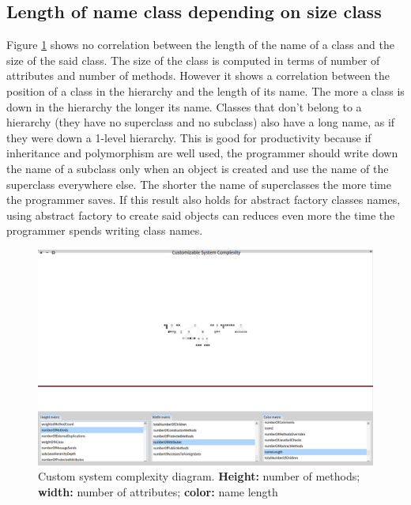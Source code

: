 \subsection{Length of name class depending on size class}
Figure \ref{fig:namelength} shows no correlation between the length of the name of a class and the size of the said class. The size of the class is computed in terms of number of attributes and number of methods.
However it shows a correlation between the position of a class in the hierarchy and the length of its name. The more a class is down in the hierarchy the longer its name. Classes that don't belong to a hierarchy (they have no superclass and no subclass) also have a long name, as if they were down a 1-level hierarchy. This is good for productivity because if inheritance and polymorphism are well used, the programmer should write down the name of a subclass only when an object is created and use the name of the superclass everywhere else. The shorter the name of superclasses the more time the programmer saves. If this result also holds for abstract factory classes names, using abstract factory to create said objects can reduces even more the time the programmer spends writing class names.

\begin{figure}[H]
    \includegraphics[width=\textwidth]{namelength.png}
    \caption{\label{fig:namelength} Custom system complexity diagram. \textbf{Height:} number of methods; \textbf{width:} number of attributes; \textbf{color:} name length}
\end{figure}
